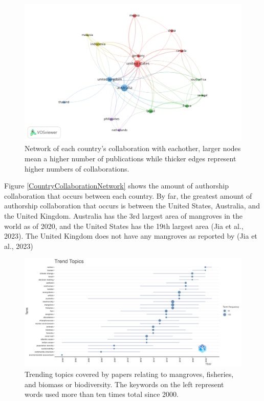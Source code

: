 \documentclass[
  12pt,
]{article}
\begin{document}
\begin{figure}
\includegraphics[width=1\linewidth]{CountryNetwork_VOS} \caption{Network of each country's collaboration with eachother, larger nodes mean a higher number of publications while thicker edges represent higher numbers of collaborations. \label{CountryCollaborationNetwork}}\label{fig:CountryCollaborationNetwork}
\end{figure}



Figure \ref{CountryCollaborationNetwork} shows the amount of authorship collaboration that occurs between each country. By far, the greatest amount of authorship collaboration that occurs is between the United States, Australia, and the United Kingdom. Australia has the 3rd largest area of mangroves in the world as of 2020, and the United States has the 19th largest area (Jia et al., 2023). The United Kingdom does not have any mangroves as reported by (Jia et al., 2023)

\begin{figure}
\includegraphics[width=1\linewidth]{TrendTopics} \caption{Trending topics covered by papers relating to mangroves, fisheries, and biomass or biodiversity. The keywords on the left represent words used more than ten times total since 2000. \label{TrendTopics}}\label{fig:TrendTopics}
\end{figure}
\end{document}
